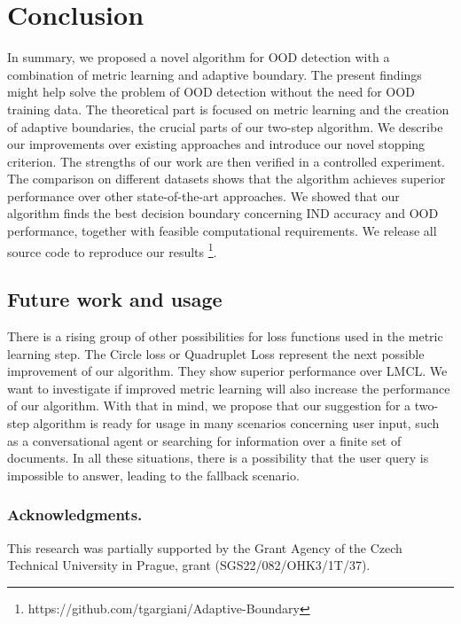 \documentclass[runningheads]{llncs}
\begin{document}
\section{Conclusion}
In summary, we proposed a novel algorithm for OOD detection with a combination of metric learning and adaptive boundary. The present findings might help solve the problem of OOD detection without the need for OOD training data. The theoretical part is focused on metric learning and the creation of adaptive boundaries, the crucial parts of our two-step algorithm. We describe our improvements over existing approaches and introduce our novel stopping criterion. The strengths of our work are then verified in a controlled experiment. The comparison on different datasets shows that the algorithm achieves superior performance over other state-of-the-art approaches. We showed that our algorithm finds the best decision boundary concerning IND accuracy and OOD performance, together with feasible computational requirements. We release all source code to reproduce our results \footnote{https://github.com/tgargiani/Adaptive-Boundary}.

\subsection{Future work and usage}

There is a rising group of other possibilities for loss functions used in the metric learning step. The Circle loss \cite{sun2020circleloss} or Quadruplet Loss \cite{chen2017quadruplettriplet} represent the next possible improvement of our algorithm. They show superior performance over LMCL. We want to investigate if improved metric learning will also increase the performance of our algorithm.  
With that in mind, we propose that our suggestion for a two-step algorithm is ready for usage in many scenarios concerning user input, such as a conversational agent or searching for information over a finite set of documents. In all these situations, there is a possibility that the user query is impossible to answer, leading to the fallback scenario.

\subsubsection{Acknowledgments.}

This research was partially supported by the Grant Agency of the Czech Technical University in Prague, grant (SGS22/082/OHK3/1T/37).



\end{document}
